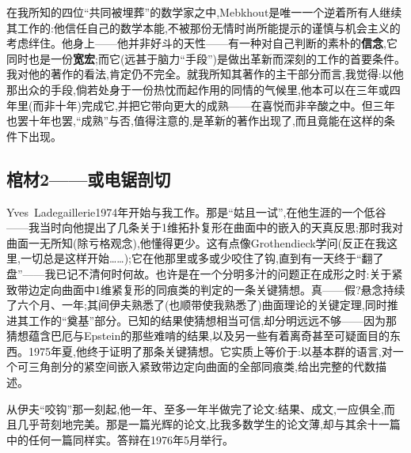 在我所知的四位“共同被埋葬”的数学家之中,Mebkhout是唯一一个逆着所有人继续其工作的:他信任自己的数学本能,不被那份无情时尚所能提示的谨慎与机会主义的考虑绊住。他身上——他并非好斗的天性——有一种对自己判断的素朴的\textbf{信念},它同时也是一份\textbf{宽宏};而它(远甚于脑力“手段”)是做出革新而深刻的工作的首要条件。我对他的著作的看法,肯定仍不完全。就我所知其著作的主干部分而言,我觉得:以他那出众的手段,倘若处身于一份热忱而起作用的同情的气候里,他本可以在三年或四年里(而非十年)完成它,并把它带向更大的成熟——在喜悦而非辛酸之中。但三年也罢十年也罢,“成熟”与否,值得注意的,是革新的著作出现了,而且竟能在这样的条件下出现。

\subsection{棺材2——或电锯剖切}


Yves~Ladegaillerie1974年开始与我工作。那是“姑且一试”,在他生涯的一个低谷——我当时向他提出了几条关于1维拓扑复形在曲面中的嵌入的天真反思;那时我对曲面一无所知(除亏格观念),他懂得更少。这有点像Grothendieck学问(反正在我这里,一切总是这样开始……);它在他那里或多或少咬住了钩,直到有一天终于“翻了盘”——我已记不清何时何故。也许是在一个分明多汁的问题正在成形之时:关于紧致带边定向曲面中1维紧复形的同痕类的判定的一条关键猜想。真——假?悬念持续了六个月、一年;其间伊夫熟悉了(也顺带使我熟悉了)曲面理论的关键定理,同时推进其工作的“奠基”部分。已知的结果使猜想相当可信,却分明远远不够——因为那猜想蕴含巴厄与Epstein的那些难啃的结果,以及另一些有着离奇甚至可疑面目的东西。1975年夏,他终于证明了那条关键猜想。它实质上等价于:以基本群的语言,对一个可三角剖分的紧空间嵌入紧致带边定向曲面的全部同痕类,给出完整的代数描述。

\dmark{}从伊夫“咬钩”那一刻起,他一年、至多一年半做完了论文:结果、成文,一应俱全,而且几乎苛刻地完美。那是一篇光辉的论文,比我多数学生的论文薄,却与其余十一篇中的任何一篇同样实。答辩在1976年5月举行。

